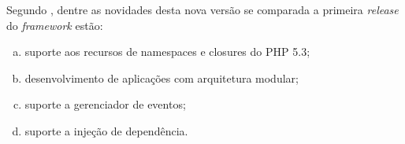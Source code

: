 Segundo , dentre as novidades
desta nova versão se comparada a primeira \textit{release} do \textit{framework}
estão:

\begin{enumerate}[a)]
    \item suporte aos recursos de namespaces e closures do \acs{PHP} 5.3;
    \item desenvolvimento de aplicações com arquitetura modular;
    \item suporte a gerenciador de eventos;
    \item suporte a injeção de dependência.
\end{enumerate}
